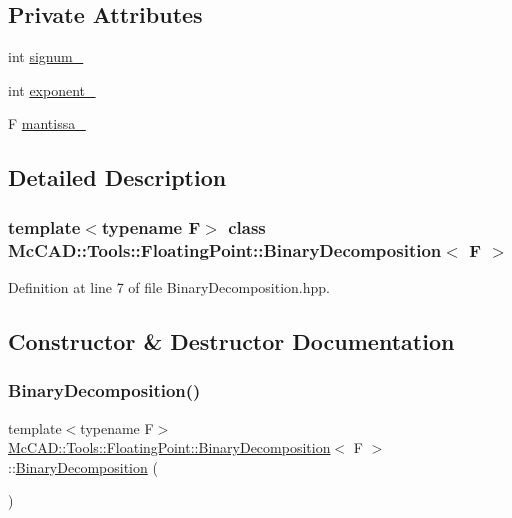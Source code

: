 \subsection*{Private Attributes}
\begin{DoxyCompactItemize}
\item 
int \hyperlink{classMcCAD_1_1Tools_1_1FloatingPoint_1_1BinaryDecomposition_a91a2c83beede49f606b6eff17eb78ec6}{signum\+\_\+}
\item 
int \hyperlink{classMcCAD_1_1Tools_1_1FloatingPoint_1_1BinaryDecomposition_a19109b2bd6f3287ab0575fa4ff425650}{exponent\+\_\+}
\item 
F \hyperlink{classMcCAD_1_1Tools_1_1FloatingPoint_1_1BinaryDecomposition_a92dc0f1fb62748eb4b3e2f08161ec842}{mantissa\+\_\+}
\end{DoxyCompactItemize}


\subsection{Detailed Description}
\subsubsection*{template$<$typename F$>$\newline
class Mc\+C\+A\+D\+::\+Tools\+::\+Floating\+Point\+::\+Binary\+Decomposition$<$ F $>$}



Definition at line 7 of file Binary\+Decomposition.\+hpp.



\subsection{Constructor \& Destructor Documentation}
\mbox{\label{classMcCAD_1_1Tools_1_1FloatingPoint_1_1BinaryDecomposition_a966269e0382ff0f3dca52e4cbe606fc9}} 
\subsubsection{\texorpdfstring{Binary\+Decomposition()}{BinaryDecomposition()}\hspace{0.1cm}{\footnotesize\ttfamily [1/2]}}
{\footnotesize\ttfamily template$<$typename F$>$ \\
\hyperlink{classMcCAD_1_1Tools_1_1FloatingPoint_1_1BinaryDecomposition}{Mc\+C\+A\+D\+::\+Tools\+::\+Floating\+Point\+::\+Binary\+Decomposition}$<$ F $>$\+::\hyperlink{classMcCAD_1_1Tools_1_1FloatingPoint_1_1BinaryDecomposition}{Binary\+Decomposition} (\begin{DoxyParamCaption}{ }\end{DoxyParamCaption})}

